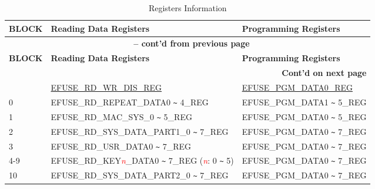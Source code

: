 \begin{longtable}[c]{|l|l|l|}
\caption{Registers Information}
\label{tab:efuse-softw-read-para}
\\\hline
    \rowcolor{lightgray}
        \textbf{BLOCK} & \textbf{Reading Data Registers} & \textbf{Programming Registers}\\
    \endfirsthead
    
    \multicolumn{3}{c}{\bfseries \tablename\ \thetable{} -- cont'd from previous page}\\\hline
    
    \rowcolor{lightgray}
        \textbf{BLOCK} & \textbf{Reading Data Registers} & \textbf{Programming Registers}\\
    \endhead
    
    \multicolumn{3}{r}{\textbf{Cont'd on next page}} \\
    \endfoot
    \endlastfoot
    \hline
0  & \hyperref[regdesc:EFUSERDWRDISREG]{EFUSE\_RD\_WR\_DIS\_REG} & \hyperref[regdesc:EFUSEPGMDATA0REG]{EFUSE\_PGM\_DATA0\_REG} \\\hline
0  & EFUSE\_RD\_REPEAT\_DATA0 \verb+~+ 4\_REG & EFUSE\_PGM\_DATA1 \verb+~+ 5\_REG \\\hline
1  & EFUSE\_RD\_MAC\_SYS\_0 \verb+~+ 5\_REG & EFUSE\_PGM\_DATA0 \verb+~+ 5\_REG \\\hline
2  & EFUSE\_RD\_SYS\_DATA\_PART1\_0 \verb+~+ 7\_REG & EFUSE\_PGM\_DATA0 \verb+~+ 7\_REG \\\hline
3  & EFUSE\_RD\_USR\_DATA0 \verb+~+ 7\_REG & EFUSE\_PGM\_DATA0 \verb+~+ 7\_REG \\ \hline
4-9 & EFUSE\_RD\_KEY\textcolor{red}{\it{n}}\_DATA0 \verb+~+ 7\_REG (\textcolor{red}{\it{n}}: 0 \verb+~+ 5) & EFUSE\_PGM\_DATA0 \verb+~+ 7\_REG \\\hline
10 & EFUSE\_RD\_SYS\_DATA\_PART2\_0 \verb+~+ 7\_REG & EFUSE\_PGM\_DATA0 \verb+~+ 7\_REG \\\hline
\end{longtable}
